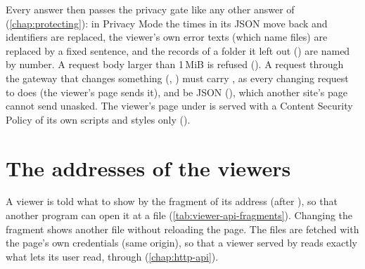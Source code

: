 Every answer then passes the privacy gate like any other answer of \md{}
(\cref{chap:protecting}): in Privacy Mode the times in its JSON move back and identifiers are
replaced, the viewer's own error texts (which name files) are replaced by a fixed sentence, and
the records of a folder it left out () are named by number. A request body larger
than 1\,MiB is refused (). A request through the gateway that changes something
(, ) must carry , as every changing request to
\md{} does (the viewer's page sends it), and be JSON (),
which another site's page cannot send unasked. The viewer's page under  is served
with a Content Security Policy of its own scripts and styles only ().

\section{The addresses of the viewers}
\label{sec:viewer-api-addresses}

A viewer is told what to show by the fragment of its address (after \code{\#}), so that another
program can open it at a file (\cref{tab:viewer-api-fragments}). Changing the fragment shows
another file without reloading the page. The files are fetched with the page's own credentials
(same origin), so that a viewer served by \md{} reads exactly what \md{} lets its user read,
through  (\cref{chap:http-api}).

